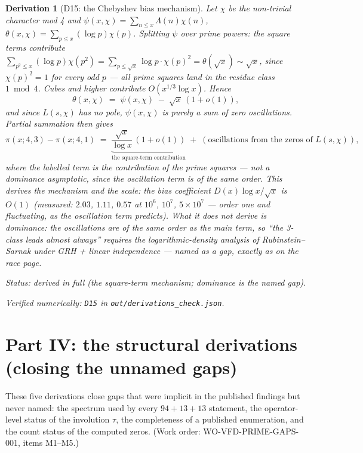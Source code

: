 \documentclass[11pt]{article}
\newtheorem{deriv}{Derivation}
\theoremstyle{remark}
\newcommand{\bucket}[1]{\par\smallskip\noindent\textit{Status: #1.}}
\newcommand{\chk}[1]{\par\noindent\textit{Verified numerically:
\texttt{#1} in \texttt{out/derivations\_check.json}.}}
\begin{document}
\begin{deriv}[D15: the Chebyshev bias mechanism]\label{d15}
Let $\chi$ be the non-trivial character mod 4 and
$\psi(x, \chi) = \sum_{n \le x} \Lambda(n)\chi(n)$,
$\theta(x, \chi) = \sum_{p \le x} (\log p)\chi(p)$. Splitting
$\psi$ over prime powers: the square terms contribute
$\sum_{p^2 \le x} (\log p)\chi(p^2) = \sum_{p \le \sqrt x} \log p
\cdot \chi(p)^2 = \theta(\sqrt x) \sim \sqrt x$, since
$\chi(p)^2 = 1$ for every odd $p$ --- \emph{all prime squares land in
the residue class} $1 \bmod 4$. Cubes and higher contribute
$O(x^{1/3}\log x)$. Hence
\[
\theta(x, \chi) \;=\; \psi(x, \chi) \;-\; \sqrt{x}\,(1 + o(1)),
\]
and since $L(s, \chi)$ has no pole, $\psi(x,\chi)$ is purely a sum of
zero oscillations. Partial summation then gives
\[
\pi(x; 4, 3) - \pi(x; 4, 1)
\;=\; \underbrace{\frac{\sqrt x}{\log x}\,(1 + o(1))}_{\text{the
square-term contribution}} \;+\;
(\text{oscillations from the zeros of } L(s,\chi)),
\]
where the labelled term is the contribution of the prime squares ---
not a dominance asymptotic, since the oscillation term is of the same
order.
This derives the \emph{mechanism} and the scale: the bias coefficient
$D(x)\log x/\sqrt x$ is $O(1)$ (measured: $2.03$, $1.11$, $0.57$ at
$10^6$, $10^7$, $5\times10^7$ --- order one and fluctuating, as the
oscillation term predicts). What it does \emph{not} derive is
dominance: the oscillations are of the same order as the main term, so
``the 3-class leads almost always'' requires the logarithmic-density
analysis of Rubinstein--Sarnak under GRH + linear independence ---
named as a gap, exactly as on the race page.
\bucket{derived in full (the square-term mechanism; dominance is the named gap)}
\chk{D15}
\end{deriv}

\section{Part IV: the structural derivations (closing the unnamed
gaps)}

These five derivations close gaps that were implicit in the published
findings but never named: the spectrum used by every $94{+}13{+}13$
statement, the operator-level status of the involution $\tau$, the
completeness of a published enumeration, and the count status of the
computed zeros. (Work order: WO-VFD-PRIME-GAPS-001, items M1--M5.)
\end{document}
